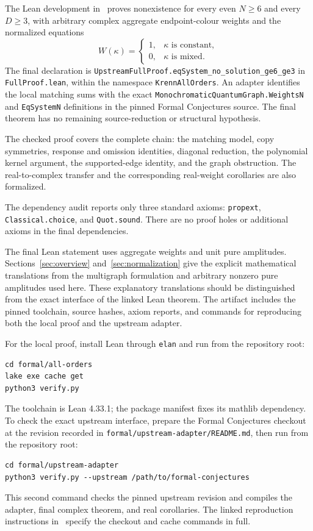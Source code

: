 \documentclass[11pt]{article}
\theoremstyle{definition}
\theoremstyle{plain}
\numberwithin{equation}{section}
\begin{document}
The Lean development in~\cite{lean} proves nonexistence for every even
\(N\ge6\) and every \(D\ge3\), with arbitrary complex aggregate
endpoint-colour weights and the normalized equations
\[
 W(\kappa)=
 \begin{cases}
  1,&\kappa\text{ is constant},\\
  0,&\kappa\text{ is mixed}.
 \end{cases}
\]
The final declaration is
\texttt{UpstreamFullProof.eqSystem\_no\_solution\_ge6\_ge3}
in \texttt{FullProof.lean}, within the namespace \texttt{KrennAllOrders}.
An adapter identifies the local matching sums with the exact
\texttt{MonochromaticQuantumGraph.WeightsN} and \texttt{EqSystemN}
definitions in the pinned Formal Conjectures source. The final theorem
has no remaining source-reduction or structural hypothesis.

The checked proof covers the complete chain: the matching model, copy
symmetries, response and omission identities, diagonal reduction, the
polynomial kernel argument, the supported-edge identity, and the graph
obstruction. The real-to-complex transfer and the corresponding real-weight
corollaries are also formalized.

The dependency audit reports only three standard axioms:
\texttt{propext}, \texttt{Classical.choice}, and \texttt{Quot.sound}.
There are no proof holes or additional axioms in the final dependencies.

The final Lean statement uses aggregate weights and unit pure amplitudes.
Sections~\ref{sec:overview} and~\ref{sec:normalization} give the explicit
mathematical translations from the multigraph formulation and arbitrary
nonzero pure amplitudes used here. These explanatory translations should
be distinguished from the exact interface of the linked Lean theorem.
The artifact includes the pinned toolchain, source hashes, axiom reports,
and commands for reproducing both the local proof and the upstream adapter.

For the local proof, install Lean through \texttt{elan} and run from the
repository root:
\begin{verbatim}
cd formal/all-orders
lake exe cache get
python3 verify.py
\end{verbatim}
The toolchain is Lean 4.33.1; the package manifest fixes its mathlib dependency.
To check the exact upstream interface, prepare the Formal Conjectures checkout
at the revision recorded in \texttt{formal/upstream-adapter/README.md}, then run
from the repository root:
\begin{verbatim}
cd formal/upstream-adapter
python3 verify.py --upstream /path/to/formal-conjectures
\end{verbatim}
This second command checks the pinned upstream revision and compiles the
adapter, final complex theorem, and real corollaries. The linked reproduction
instructions in~\cite{lean} specify the checkout and cache commands in full.
\end{document}
